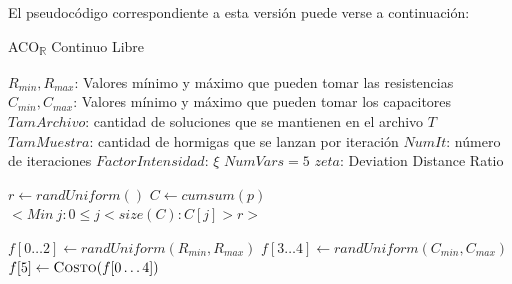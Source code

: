 \documentclass{llncs}
\begin{document}
	El pseudocódigo correspondiente a esta versión puede verse a continuación:
		\begin{algorithm}[H]
		\caption{ACO\textsubscript{$\mathbb{R}$} Continuo Libre}
		\label{alg:continuoLibre}
		\begin{algorithmic}[1]
			\State $R_{min}, R_{max}$: Valores mínimo y máximo que pueden tomar las resistencias
			\State $C_{min}, C_{max}$: Valores mínimo y máximo que pueden tomar los capacitores 
			\State $TamArchivo$: cantidad de soluciones que se mantienen en el archivo $T$
			\State $TamMuestra$: cantidad de hormigas que se lanzan por iteración
			\State $NumIt$: número de iteraciones
			\State $FactorIntensidad$: $\xi$
			\State $NumVars = 5$ 
			\State $zeta$: Deviation Distance Ratio
						
			\item[]

			\State $r \gets randUniform()$
			\State $C \gets cumsum(p)$
			\State \Return $\bigl<Min\ j: 0 \leq j <size(C): C[j] > r \bigr>$
			\EndFunction
			
			\item[]
			
			 
			\State $f[0\dots2] \gets randUniform(R_{min}, R_{max})$
			\State $f[3\dots4] \gets randUniform(C_{min}, C_{max})$
			\State $f[5] \gets \Call{Costo}{f[0\dots4]}$
			\EndFor
			\EndProcedure
			
			\item[]
			

\end{algorithmic}
\end{algorithm}
\end{document}

